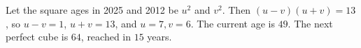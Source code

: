 Let the square ages in 2025 and 2012 be $u^2$ and $v^2$. Then $(u-v)(u+v)=13$, so $u-v=1$, $u+v=13$, and $u=7,v=6$. The current age is $49$. The next perfect cube is $64$, reached in $\boxed{15}$ years.
